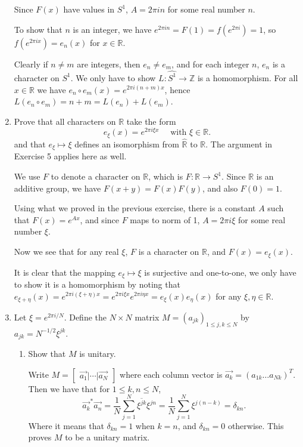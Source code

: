 \documentclass{article}
\begin{document}
\begin{enumerate}
\begin{solution}
        Since $F(x)$ have values in $S^1$, $A=2\pi in$ for some real number $n$.

        To show that $n$ is an integer, we have $e^{2\pi in} = F(1)=f(e^{2\pi i}) = 1$, so $f(e^{2\pi ix})=e_n(x)$ for $x\in\mathbb R$.

        Clearly if $n\neq m$ are integers, then $e_n\neq e_m$, and for each integer $n$, $e_n$ is a character on $S^1$. We only have to show
        $L: \widehat{S^1} \to \mathbb Z$ is a homomorphism. For all $x\in\mathbb R$ we have $e_n\circ e_m(x) = e^{2\pi i(n+m)x}$,
        hence $L(e_n\circ e_m) = n+m = L(e_n) + L(e_m)$.
    \end{solution}

    \item Prove that all characters on $\mathbb R$ take the form
    $$e_\xi(x) = e^{2\pi i\xi x}\quad \text{ with }\xi\in\mathbb R.$$
    and that $e_\xi\mapsto \xi$ defines an isomorphism from $\widehat{\mathbb R}$ to $\mathbb R$. The argument in Exercise 5
    applies here as well.

    \begin{solution}
        We use $F$ to denote a character on $\mathbb R$, which is $F: \mathbb R\to S^1$. Since $\mathbb R$ is an additive group,
        we have $F(x+y) = F(x)F(y)$, and also $F(0)=1$.

        Using what we proved in the previous exercise, there is a constant $A$ such that $F(x) = e^{Ax}$, and since $F$ maps to norm of 1,
        $A=2\pi i\xi$ for some real number $\xi$.

        Now we see that for any real $\xi$, $F$ is a character on $\mathbb R$, and $F(x) = e_\xi(x)$.

        It is clear that the mapping $e_\xi\mapsto \xi$ is surjective and one-to-one, we only have to show it is a homomorphism by
        noting that $e_{\xi+\eta}(x) = e^{2\pi i(\xi+\eta)x} = e^{2\pi i\xi x}e^{2\pi i\eta x} = e_\xi(x)e_\eta(x)$ for any $\xi, \eta\in\mathbb R$.

    \end{solution}

    \item Let $\xi=e^{2\pi i/N}$. Define the $N\times N$ matrix $M=(a_{jk})_{1\leq j,k\leq N}$ by $a_{jk}=N^{-1/2}\xi^{jk}$.
    \begin{enumerate}
        \item Show that $M$ is unitary.
        
        \begin{solution}
            Write $M=\begin{bmatrix}
                \vec{a_1} | \cdots | \vec{a_N}
            \end{bmatrix}$ where each column vector is $\vec{a_k}=(a_{1k}\dots a_{Nk})^T$. Then we have that for $1\leq k,n\leq N$,
            $$\vec{a_k}^* \vec{a_n} = \dfrac1N \sum_{j=1}^N \overline{\xi^{jk}} \xi^{jn} = \dfrac1N \sum_{j=1}^N \xi^{j(n-k)} = \delta_{kn}.$$
            Where it means that $\delta_{kn}=1$ when $k=n$, and $\delta_{kn}=0$ otherwise. This proves $M$ to be a unitary matrix.
        \end{solution}


\end{enumerate}
\end{enumerate}
\end{document}
